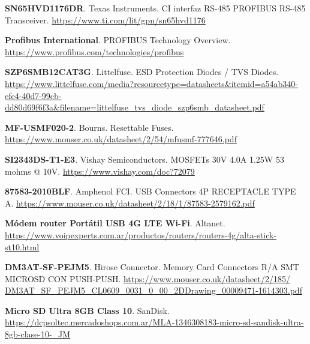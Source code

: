 \begin{thebibliography}{30}
\textbf{SN65HVD1176DR}. Texas Instruments. CI interfaz RS-485 PROFIBUS RS-485 Transceiver. 
\href{https://www.ti.com/lit/gpn/sn65hvd1176}{https://www.ti.com/lit/gpn/sn65hvd1176}

\textbf{Profibus International}. PROFIBUS Technology Overview.
\href{https://www.profibus.com/technologies/profibus}{https://www.profibus.com/technologies/profibus}

\textbf{SZP6SMB12CAT3G}. Littelfuse. ESD Protection Diodes / TVS Diodes.
\href{https://www.littelfuse.com/media?resourcetype=datasheets&itemid=a54ab340-efe4-40d7-99cb-dd80d69f6f3a&filename=littelfuse_tvs_diode_szp6smb_datasheet.pdf}{https://www.littelfuse.com/media?resourcetype=datasheets\&itemid=a54ab340-efe4-40d7-99cb-dd80d69f6f3a\&filename=littelfuse\_tvs\_diode\_szp6smb\_datasheet.pdf}


\textbf{MF-USMF020-2}. Bourns. Resettable Fuses.
\href{https://www.mouser.co.uk/datasheet/2/54/mfusmf-777646.pdf}{https://www.mouser.co.uk/datasheet/2/54/mfusmf-777646.pdf}


\textbf{SI2343DS-T1-E3}. Vishay Semiconductors. MOSFETs 30V 4.0A 1.25W 53 mohms @ 10V. 
\href{https://www.vishay.com/doc?72079}{https://www.vishay.com/doc?72079}

\textbf{87583-2010BLF}. Amphenol FCI. USB Connectors 4P RECEPTACLE TYPE A.
\href{https://www.mouser.co.uk/datasheet/2/18/1/87583-2579162.pdf}{https://www.mouser.co.uk/datasheet/2/18/1/87583-2579162.pdf}

\textbf{Módem router Portátil USB 4G LTE Wi-Fi}. Altanet.
\href{https://www.voipexperts.com.ar/productos/routers/routers-4g/alta-stick-st10.html}{https://www.voipexperts.com.ar/productos/routers/routers-4g/alta-stick-st10.html}


\textbf{DM3AT-SF-PEJM5}. Hirose Connector. Memory Card Connectors R/A SMT MICROSD CON PUSH-PUSH.
\href{https://www.mouser.co.uk/datasheet/2/185/DM3AT_SF_PEJM5_CL0609_0031_0_00_2DDrawing_00009471-1614303.pdf}{https://www.mouser.co.uk/datasheet/2/185/ DM3AT\_SF\_PEJM5\_CL0609\_0031\_0\_00\_2DDrawing\_00009471-1614303.pdf}


\textbf{Micro SD Ultra 8GB Class 10}. SanDisk.
\href{https://dcpsoltec.mercadoshops.com.ar/MLA-1346308183-micro-sd-sandisk-ultra-8gb-clase-10-_JM}{https://dcpsoltec.mercadoshops.com.ar/MLA-1346308183-micro-sd-sandisk-ultra-8gb-clase-10-\_JM}


\end{thebibliography}
